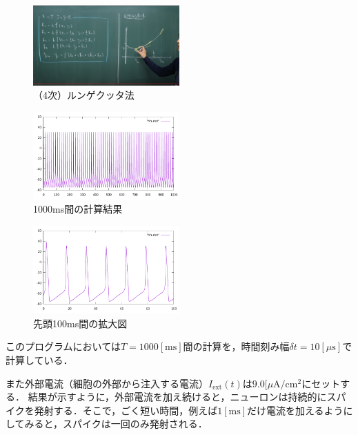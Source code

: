 \documentclass[dvipdfmx, A4j, twocolumn, 10.5pt]{jsarticle}
\begin{document}
\begin{figure}[h]
    \centering
    \includegraphics[width=0.5\textwidth]{images/rk4.png}
    \caption{（4次）ルンゲクッタ法}
\end{figure}

\begin{figure}[h]
    \centering
    \includegraphics[width=0.5\textwidth]{images/0301_hh_1000.pdf}
    \caption{1000ms間の計算結果}
\end{figure}

\begin{figure}[h]
    \centering
    \includegraphics[width=0.5\textwidth]{images/0301_hh_100.pdf}
    \caption{先頭100ms間の拡大図}
\end{figure}


\vspace{\baselineskip}

このプログラムにおいては$T=1000[\mathrm{ms}]$間の計算を，時間刻み幅$\delta t=10 [\mu \mathrm{s}]$で計算している．

また外部電流（細胞の外部から注入する電流）$I_{\mathrm{ext}}(t)$は$9.0[\mu \mathrm{A} / \mathrm{cm}^2$にセットする．
結果が示すように，外部電流を加え続けると，ニューロンは持続的にスパイクを発射する．そこで，ごく短い時間，例えば$1[\mathrm{ms}]$だけ電流を加えるようにしてみると，スパイクは一回のみ発射される．
\end{document}

